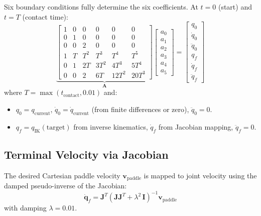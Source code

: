 \documentclass[11pt,letterpaper]{article}
\newcommand{\vv}[1]{\mathbf{#1}}
\begin{document}
Six boundary conditions fully determine the six coefficients.  At $t=0$ (start) and $t=T$ (contact time):
\begin{equation}
    \underbrace{\begin{bmatrix} 1 & 0 & 0 & 0 & 0 & 0 \\ 0 & 1 & 0 & 0 & 0 & 0 \\ 0 & 0 & 2 & 0 & 0 & 0 \\ 1 & T & T^2 & T^3 & T^4 & T^5 \\ 0 & 1 & 2T & 3T^2 & 4T^3 & 5T^4 \\ 0 & 0 & 2 & 6T & 12T^2 & 20T^3 \end{bmatrix}}_{\vv{A}}
    \begin{bmatrix} a_0\\a_1\\a_2\\a_3\\a_4\\a_5 \end{bmatrix}
    = \begin{bmatrix} q_0\\\dot{q}_0\\\ddot{q}_0\\q_f\\\dot{q}_f\\\ddot{q}_f \end{bmatrix}
\end{equation}
where $T = \max(t_{\text{contact}}, 0.01)$ and:
\begin{itemize}[nosep]
    \item $q_0 = q_{\text{current}}$, $\dot{q}_0 = \dot{q}_{\text{current}}$ (from finite differences or zero), $\ddot{q}_0 = 0$.
    \item $q_f = q_{\text{IK}}(\text{target})$ from inverse kinematics, $\dot{q}_f$ from Jacobian mapping, $\ddot{q}_f = 0$.
\end{itemize}

\subsection{Terminal Velocity via Jacobian}

The desired Cartesian paddle velocity $\vv{v}_{\text{paddle}}$ is mapped to joint velocity using the damped pseudo-inverse of the Jacobian:
\begin{equation}
    \dot{\vv{q}}_f = \vv{J}^T\!\left(\vv{J}\vv{J}^T + \lambda^2\,\vv{I}\right)^{-1}\vv{v}_{\text{paddle}}
    \label{eq:damped_pinv}
\end{equation}
with damping $\lambda = 0.01$.
\end{document}

